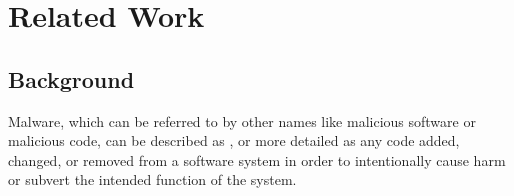 \documentclass{llncs}
\begin{document}
%
%
%
%
%

\section{Related Work}\label{sec:related_work}


\subsection{Background}\label{subsec:background}
Malware, which can be referred to by other names like malicious software or malicious code, can be described as \cite{christodorescu:semantics}, or more detailed as any code added, changed, or removed from a software system in order to intentionally cause harm or subvert the intended function of the system\cite{mcgraw:mal_code}.
\end{document}
